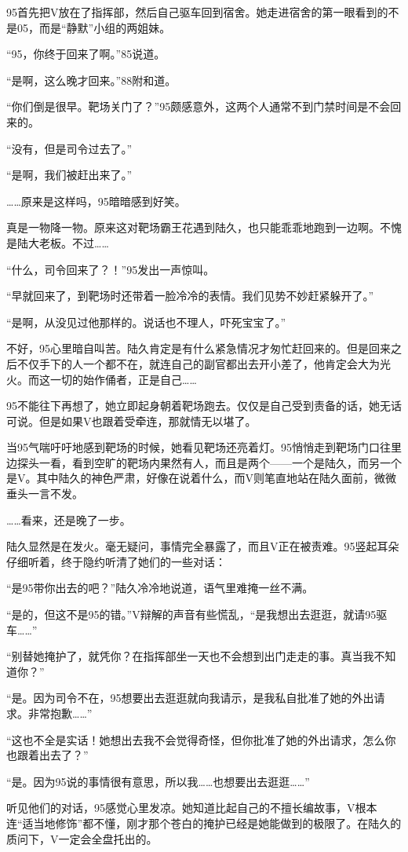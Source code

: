 95首先把V放在了指挥部，然后自己驱车回到宿舍。她走进宿舍的第一眼看到的不是05，而是“静默”小组的两姐妹。

“95，你终于回来了啊。”85说道。

“是啊，这么晚才回来。”88附和道。

“你们倒是很早。靶场关门了？”95颇感意外，这两个人通常不到门禁时间是不会回来的。

“没有，但是司令过去了。”

“是啊，我们被赶出来了。”

……原来是这样吗，95暗暗感到好笑。

真是一物降一物。原来这对靶场霸王花遇到陆久，也只能乖乖地跑到一边啊。不愧是陆大老板。不过……

“什么，司令回来了？！”95发出一声惊叫。

“早就回来了，到靶场时还带着一脸冷冷的表情。我们见势不妙赶紧躲开了。”

“是啊，从没见过他那样的。说话也不理人，吓死宝宝了。”

不好，95心里暗自叫苦。陆久肯定是有什么紧急情况才匆忙赶回来的。但是回来之后不仅手下的人一个都不在，就连自己的副官都出去开小差了，他肯定会大为光火。而这一切的始作俑者，正是自己……

95不能往下再想了，她立即起身朝着靶场跑去。仅仅是自己受到责备的话，她无话可说。但是如果V也跟着受牵连，那就情无以堪了。

当95气喘吁吁地感到靶场的时候，她看见靶场还亮着灯。95悄悄走到靶场门口往里边探头一看，看到空旷的靶场内果然有人，而且是两个——一个是陆久，而另一个是V。其中陆久的神色严肃，好像在说着什么，而V则笔直地站在陆久面前，微微垂头一言不发。 

……看来，还是晚了一步。

陆久显然是在发火。毫无疑问，事情完全暴露了，而且V正在被责难。95竖起耳朵仔细听着，终于隐约听清了她们的一些对话：

“是95带你出去的吧？”陆久冷冷地说道，语气里难掩一丝不满。

“是的，但这不是95的错。”V辩解的声音有些慌乱，“是我想出去逛逛，就请95驱车……”

“别替她掩护了，就凭你？在指挥部坐一天也不会想到出门走走的事。真当我不知道你？”

“是。因为司令不在，95想要出去逛逛就向我请示，是我私自批准了她的外出请求。非常抱歉……”

“这也不全是实话！她想出去我不会觉得奇怪，但你批准了她的外出请求，怎么你也跟着出去了？”

“是。因为95说的事情很有意思，所以我……也想要出去逛逛……”

听见他们的对话，95感觉心里发凉。她知道比起自己的不擅长编故事，V根本连“适当地修饰”都不懂，刚才那个苍白的掩护已经是她能做到的极限了。在陆久的质问下，V一定会全盘托出的。

